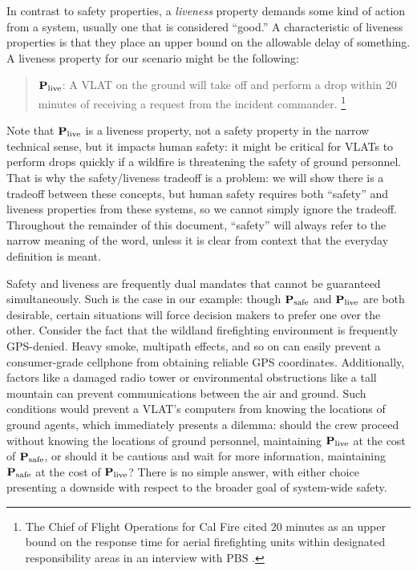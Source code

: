 \documentclass[]             %
{NASA}                       %
\theoremstyle{definition}
\begin{document}
In contrast to safety properties, a \emph{liveness} property demands some kind of action
from a system, usually one that is considered ``good.'' A
characteristic of liveness properties is that they place an upper
bound on the allowable delay of something. A liveness
property for our scenario might be the following:
\begin{quote}
  $\textbf{P}_\textrm{live}$: A VLAT on the ground will take off and
  perform a drop within 20 minutes of receiving a request from the
  incident commander. \footnote{The Chief of Flight Operations for Cal
    Fire cited 20 minutes as an upper bound on the response time for
    aerial firefighting units within designated responsibility areas
    in an interview with PBS \cite{2021:aerialfirefighting}.}
\end{quote}

Note that $\textbf{P}_\textrm{live}$
is a liveness property, not a safety property in the narrow technical
sense, but it impacts human safety: it might be critical for VLATs to
perform drops quickly if a wildfire is threatening the safety of
ground personnel. That is why the safety/liveness tradeoff is a problem: we will show there is a tradeoff between these concepts, but human safety requires both ``safety'' and liveness properties from these systems, so we cannot simply ignore the tradeoff. Throughout the remainder of this document, ``safety'' will always refer to the narrow meaning of the word, unless it is clear from context that the everyday definition is meant.

Safety and liveness are frequently dual mandates that cannot be
guaranteed simultaneously. Such is the case in our example: though
$\textbf{P}_\textrm{safe}$ and $\textbf{P}_\textrm{live}$ are both desirable, certain situations will
force decision makers to prefer one over the other. Consider the fact
that the wildland firefighting environment is frequently GPS-denied.
Heavy smoke, multipath effects, and so on can easily prevent a
consumer-grade cellphone from obtaining reliable GPS
coordinates. Additionally, factors like a damaged radio tower or
environmental obstructions like a tall mountain can prevent
communications between the air and ground. Such conditions would
prevent a VLAT's computers from knowing the locations of ground
agents, which immediately presents a dilemma: should the crew proceed
without knowing the locations of ground personnel, maintaining
$\textbf{P}_\textrm{live}$ at the cost of $\textbf{P}_\textrm{safe}$, or should it be cautious and wait
for more information, maintaining $\textbf{P}_\textrm{safe}$ at the cost of $\textbf{P}_\textrm{live}$?
There is no simple answer, with either choice presenting a downside
with respect to the broader goal of system-wide safety.
\end{document}
